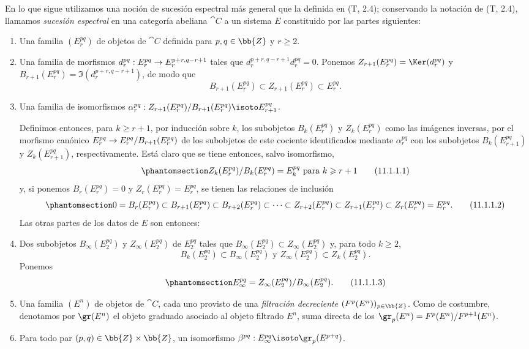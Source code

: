 \documentclass[oneside]{amsart}
\makeatletter
\renewcommand{\geq}{\geqslant}
\newcommand{\ega@arrow}[2]{\mathchoice{#1}{#2}{#2}{#2}}
\renewcommand{\to}{\ega@arrow{\longrightarrow}{\rightarrow}}
\newcommand{\oldpage}[2][]{{\marginnote{\normalfont\textbf{#1}~|~#2}}\ignorespaces}
\let\EGAOriginalLabel\label
\renewcommand{\label}[1]{\phantomsection\EGAOriginalLabel{#1}}
\makeatother
\begin{document}
\begin{env}[11.1.1]
\label{0.11.1.1}
En lo que sigue utilizamos una noción de sucesión espectral más general que la definida en (T, 2.4); conservando la notación de (T, 2.4), llamamos \emph{sucesión espectral} en una categoría abeliana $\cat{C}$ a un sistema $E$ constituido por las partes siguientes:
\begin{enumerate}
  \item[$(a)$] Una familia $(E_r^{pq})$ de objetos de $\cat{C}$ definida para $p,q\in\bb{Z}$ y $r\geq 2$.
  \item[$(b)$] Una familia de morfismos $d_r^{pq}:E_r^{pq}\to E_r^{p+r,q-r+1}$ tales que $d_r^{p+r,q-r+1}d_r^{pq}=0$.
    Ponemos $Z_{r+1}(E_r^{pq})=\Ker(d_r^{pq})$ y $B_{r+1}(E_r^{pq})=\Im(d_r^{p+r,q-r+1})$, de modo que
    \[
      B_{r+1}(E_r^{pq})\subset Z_{r+1}(E_r^{pq})\subset E_r^{pq}.
    \]
  \item[$(c)$] Una familia de isomorfismos $\alpha_r^{pq}:Z_{r+1}(E_r^{pq})/B_{r+1}(E_r^{pq})\isoto E_{r+1}^{pq}$.

  Definimos entonces, para $k\geq r+1$, por inducción sobre $k$, los subobjetos $B_k(E_r^{pq})$ y $Z_k(E_r^{pq})$ como las imágenes inversas, por el morfismo canónico $E_r^{pq}\to E_r^{pq}/B_{r+1}(E_r^{pq})$ de los subobjetos de este cociente identificados mediante $\alpha_r^{pq}$ con los subobjetos $B_k(E_{r+1}^{pq})$ y $Z_k(E_{r+1}^{pq})$, respectivamente.
Está claro que se tiene entonces, salvo isomorfismo,
  \[
  \label{0.11.1.1.1}
    Z_k(E_r^{pq})/B_k(E_r^{pq})=E_k^{pq}\text{ para }k\geq r+1
    \tag{11.1.1.1}
  \]
  y, si ponemos $B_r(E_r^{pq})=0$ y $Z_r(E_r^{pq})=E_r^{pq}$, se tienen las relaciones de inclusión
  \[
  \label{0.11.1.1.2}
    0=B_r(E_r^{pq})\subset B_{r+1}(E_r^{pq})\subset B_{r+2}(E_r^{pq})\subset\cdots\subset Z_{r+2}(E_r^{pq})\subset Z_{r+1}(E_r^{pq})\subset Z_r(E_r^{pq})=E_r^{pq}.
    \tag{11.1.1.2}
  \]
  Las otras partes de los datos de $E$ son entonces:
  \item[$(d)$] Dos subobjetos $B_\infty(E_2^{pq})$ y $Z_\infty(E_2^{pq})$ de $E_2^{pq}$ tales que $B_\infty(E_2^{pq})\subset Z_\infty(E_2^{pq})$ y, para todo $k\geq 2$,
    \[
      B_k(E_2^{pq})\subset B_\infty(E_2^{pq})\text{ y }Z_\infty(E_2^{pq})\subset Z_k(E_2^{pq}).
    \]
    Ponemos
    \[
    \label{0.11.1.1.3}
      E_\infty^{pq}=Z_\infty(E_2^{pq})/B_\infty(E_2^{pq}).
      \tag{11.1.1.3}
    \]
  \item[$(e)$]
\oldpage[0\textsubscript{III}]{24}
    Una familia $(E^n)$ de objetos de $\cat{C}$, cada uno provisto de una \emph{filtración decreciente $(F^p(E^n))_{p\in\bb{Z}}$}.
    Como de costumbre, denotamos por $\gr(E^n)$ el objeto graduado asociado al objeto filtrado $E^n$, suma directa de los $\gr_p(E^n)=F^p(E^n)/F^{p+1}(E^n)$.
  \item[$(f)$] Para todo par $(p,q)\in\bb{Z}\times\bb{Z}$, un isomorfismo $\beta^{pq}:E_\infty^{pq}\isoto\gr_p(E^{p+q})$.
\end{enumerate}


\end{env}
\end{document}
